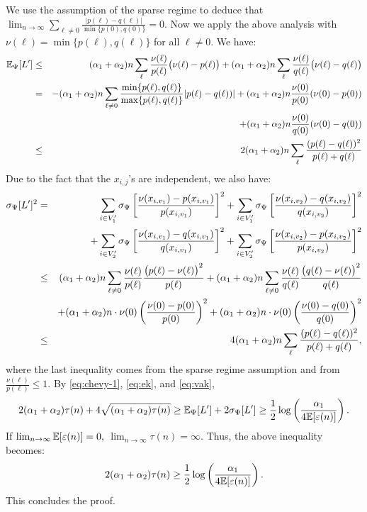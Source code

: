 We use the assumption of the sparse regime to deduce that $\lim_{n \to \infty} \sum_{\ell \neq 0} \frac{|p(\ell)-q(\ell)|}{\min\{p(0), q(0) \}} = 0$. Now we apply the above analysis with $\nu(\ell) = \min\{ p(\ell) , q(\ell)\}$ for all $\ell \neq 0.$ 
We have:
\begin{eqnarray}
{\mathbb E}_{\Psi}[L'] &\le&(\alpha_1 + \alpha_2) n\sum_{\ell}\frac{ \nu(\ell)}{p(\ell)}\big( \nu(\ell)-p(\ell) \big)+ (\alpha_1 + \alpha_2)n\sum_{\ell}\frac{ \nu(\ell)}{q(\ell)}\big( \nu(\ell)-q(\ell) \big)  \cr
& = &-(\alpha_1 + \alpha_2) n\sum_{\ell \neq 0}
\frac{\min\{p(\ell),q(\ell) \}}{\max\{p(\ell),q(\ell) \}}
|p(\ell)-q(\ell))| + (\alpha_1 + \alpha_2) n\frac{\nu(0)}{p(0)}(\nu(0)-p(0)) \cr&&+(\alpha_1 + \alpha_2)n\frac{\nu(0)}{q(0)}(\nu(0)-q(0)) \cr
& \le &2(\alpha_1 + \alpha_2)n\sum_{\ell }\frac{(p(\ell)-q(\ell))^2}{p(\ell) + q(\ell)} 
\label{eq:ek} 
\end{eqnarray}
Due to the fact that the $x_{i,j}$'s are independent, we also have: 
\begin{eqnarray}
\sigma_{\Psi}[L']^2& = &  \sum_{i\in V_1'}
  \sigma_{\Psi}\left[\frac{\nu(x_{i,v_1}) -
    p(x_{i,v_1})}{p(x_{i,v_1})}\right]^2
  +\sum_{i\in V_1'}\sigma_{\Psi}\left[\frac{\nu(x_{i,v_2})-q(x_{i,v_2})}{q(x_{i,v_2})} \right]^2
  \cr & &+ \sum_{i \in V_2'}
 \sigma_{\Psi}\left[
   \frac{\nu(x_{i,v_1})-q(x_{i,v_1})}{q(x_{i,v_1})}
   \right]^2+\sum_{i \in V_2'}  \sigma_{\Psi} \left[
    \frac{\nu(x_{i,v_2})-p(x_{i,v_2})}{p(x_{i,v_2})} \right]^2 \cr
&\le& (\alpha_1 + \alpha_2)n\sum_{\ell \neq 0}\frac{\nu(\ell)}{p(\ell)}\frac{\big( p(\ell)-\nu(\ell)
  \big)^2}{p(\ell)}+ (\alpha_1 + \alpha_2)n\sum_{\ell\neq 0}\frac{\nu(\ell)}{q(\ell)}\frac{\big( q(\ell)-\nu(\ell)
  \big)^2}{q(\ell)} \cr && + (\alpha_1 + \alpha_2)n\cdot\nu(0)\left(\frac{\nu(0)-p(0)}{
    p(0)}\right)^2 +(\alpha_1 + \alpha_2)n\cdot\nu(0)\left(\frac{\nu(0)-q(0)}{
    q(0)}\right)^2 \cr
&\le & 4(\alpha_1 + \alpha_2) n\sum_{\ell}\frac{(p(\ell)-q(\ell))^2}{p(\ell) +
  q(\ell)}, \label{eq:vak}
\end{eqnarray}
where the last inequality comes from the sparse regime assumption and from
$\frac{\nu(\ell)}{p(\ell)} \le 1.$ By \eqref{eq:chevy-1},
\eqref{eq:ek}, and \eqref{eq:vak},
$$2(\alpha_1 + \alpha_2 )\tau (n) + 4 \sqrt{(\alpha_1 + \alpha_2 ) \tau (n)} \ge {\mathbb E}_{\Psi}[L'] +2\sigma_{\Psi}[L']  \ge \frac{1}{2}\log \left( \frac{\alpha_1}{4 {\mathbb E} [
    \varepsilon(n) ]} \right) .$$
If $\lim_{n\rightarrow \infty} {\mathbb E} [ \varepsilon(n)] = 0,$ $\lim_{n\to
\infty}\tau(n) = \infty$. Thus, the above inequality becomes:
$$2(\alpha_1 + \alpha_2 ) \tau (n) \ge \frac{1}{2}\log \left( \frac{\alpha_1}{4 {\mathbb E} [
    \varepsilon(n) ]} \right). $$ 
This concludes the proof.


